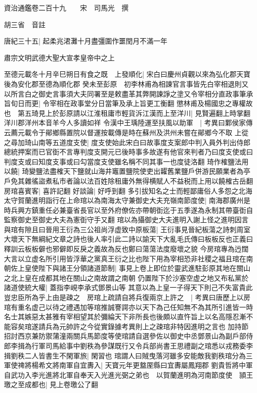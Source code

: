 資治通鑑卷二百十九　　宋　司馬光　撰

胡三省　音註

唐紀三十五|{
	起柔兆涒灘十月盡彊圍作噩閏月不滿一年}


肅宗文明武德大聖大宣孝皇帝中之上

至德元載冬十月辛巳朔日有食之既　上發順化|{
	宋白曰慶州貞觀以來為弘化郡天寶後為安化郡至德為順化郡}
癸未至彭原　初李林甫為相諫官言事皆先白宰相退則又以所言白之御史言事須大夫同署至是敕盡革其弊開諫諍之塗又令宰相分直政事筆承旨旬日而更|{
	令宰相在政事堂分日當筆及承上旨更工衡翻}
懲林甫及楊國忠之專權故也　第五琦見上於彭原請以江淮租庸市輕貨泝江漢而上至洋川|{
	見賢遍翻上時掌翻洋川郡洋州本音羊今人多讀如祥}
令漢中王瑀陸運至扶風以助軍　|{
	考異曰鄴侯家傳云薦元載令于鄖鄉縣置院以督運按載傳是時在蘇州及洪州未嘗在鄖鄉今不取}
上從之尋加琦山南等五道度支使|{
	度支使始此宋白曰故事度支案郎中判入員外判出侍郎總統押案而已官衘不言專判度支開元已後時事多故遂有他官來判者乃曰度支使或曰判度支或曰知度支事或曰勾當度支使雖名稱不同其事一也度徒洛翻}
琦作榷鹽法用以饒|{
	琦變鹽法盡榷天下鹽就山海井竈置鹽院使吏出糶舊業鹽戶併游民願業者為亭戶免其雜徭盜煮私市者論以法百姓除租庸外無得横賦人不益税而上用以饒榷古岳翻}
房琯喜賓客|{
	喜許記翻}
好談論|{
	好呼到翻}
多引拔知名之士而輕鄙庸俗人多怨之北海太守賀蘭進明詣行在上命琯以為南海太守兼御史大夫充嶺南節度使|{
	南海郡廣州是時兵興方鎮重任必兼臺省長官以至外府僚佐亦帶朝衘迄于五季遂為永制其帶臺衘自監察御史至御史大夫為憲衘守手又翻}
琯以為攝御史大夫進明入謝上怪之進明因言與琯有隙且曰晉用王衍為三公祖尚浮虚致中原板蕩|{
	王衍事見晉紀板蕩之詩刺周室大壞天下無綱紀文章之詩也後人率引此二詩以諭天下大亂毛氏傳曰板板反也正義曰釋訓云板板僻也邪僻即反戾之義故為反也鄭曰蕩蕩法度廢壞之貌}
今房琯專為迃闊大言以立虚名所引用皆浮華之黨真王衍之比也陛下用為宰相恐非社稷之福且琯在南朝佐上皇使陛下與諸王分領諸道節制|{
	事見上卷上即位於靈武進駐彭原其地在關山之北上皇在成都其地在關山之南故謂之南朝}
仍置陛下於沙塞空虚之地又布私黨於諸道使統大權|{
	蓋指李峴李承式鄧景山等}
其意以為上皇一子得天下則己不失富貴此豈忠臣所為乎上由是疎之　房琯上疏請自將兵復兩京上許之　|{
	考異曰唐歷上以房琯有重名虚己以待之禮遇加等琯推誠謇諤亦以天下為己任知無不為其所引進皆一時名士其嫉惡太甚雅有宰相望其於彌綸天下非所長也後頗以直忤旨上以名高隱忍漸不能容矣琯遂請兵為元帥許之今從實錄據考異則上之疎琯非特因進明之言也}
加持節招討西京兼防禦蒲潼兩關兵馬節度等使琯請自選參佐以御史中丞鄧景山為副戶部侍郎李揖為行軍司馬給事中劉秩為參謀既行又令兵部尚書王思禮副之琯悉以戎務委李揖劉秩二人皆書生不閑軍旅|{
	閑習也}
琯謂人曰賊曳落河雖多安能敵我劉秩琯分為三軍使禆將楊希文將南軍自宜夀入|{
	天寶元年更盩厔縣曰宜夀屬鳳翔郡}
劉貴哲將中軍自武功入李光進將北軍自奉天入光進光弼之弟也　以賀蘭進明為河南節度使　頴王璬之至成都也|{
	見上卷璬公了翻}
